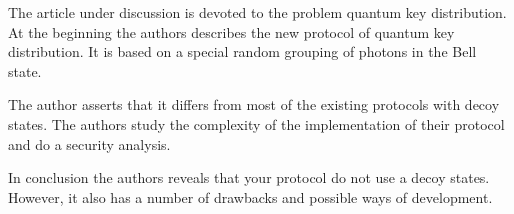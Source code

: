 The article under discussion is devoted to the problem quantum key distribution. At the beginning the authors describes the new protocol of quantum key distribution. It is based on a special random grouping of photons in the Bell state.

The author asserts that it differs from most of the existing protocols with decoy states. The authors study the complexity of the implementation of their protocol and do a security analysis.

In conclusion the authors reveals that your protocol do not use a decoy states. However, it also has a number of drawbacks and possible ways of development.


\subsection{\dic}
